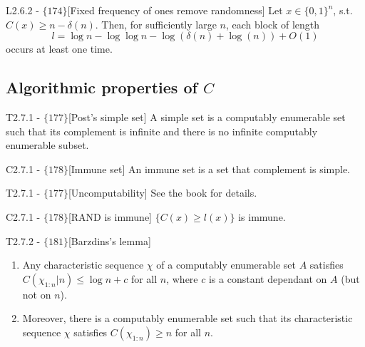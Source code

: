\documentclass{article}
\begin{document}
\begin{flexitheorem}{L2.6.2 - $\{174\}$}[Fixed frequency of ones remove randomness] Let $x \in \{0,1\}^n$, s.t. $C(x) \geq n - \delta(n)$. Then, for sufficiently large $n$, each block of length
    \begin{equation}
        l = \log n - \log \log n - \log(\delta(n) + \log (n)) + O(1)
    \end{equation}
    occurs at least one time.
\end{flexitheorem}

\subsection{Algorithmic properties of $C$}

\begin{flexidefinition}{T2.7.1 - $\{177\}$}[Post's simple set]
    A simple set is a computably enumerable set such that its complement is infinite and there is no infinite computably enumerable subset.
\end{flexidefinition}

\begin{flexidefinition}{C2.7.1 - $\{178\}$}[Immune set]
    An immune set is a set that complement is simple.
\end{flexidefinition}

\begin{flexitheorem}{T2.7.1 - $\{177\}$}[Uncomputability]
    See the book for details.
\end{flexitheorem}

\begin{flexitheorem}{C2.7.1 - $\{178\}$}[RAND is immune]
    $\{ C(x) \geq l(x) \}$ is immune.
\end{flexitheorem}

\begin{flexilemma}{T2.7.2 - $\{181\}$}[Barzdins's lemma]

    \begin{enumerate}[label = (\alph*)]
        \item Any characteristic sequence $\chi$ of a computably enumerable set $A$ satisfies $C(\chi_{1:n}|n) \leq \log n + c$ for all $n$, where $c$ is a constant dependant on $A$ (but not on $n$).
        \item Moreover, there is a computably enumerable set such that its characteristic sequence $\chi$ satisfies $C(\chi_{1:n}) \geq n$ for all $n$.
    \end{enumerate}
\end{flexilemma}
\end{document}
